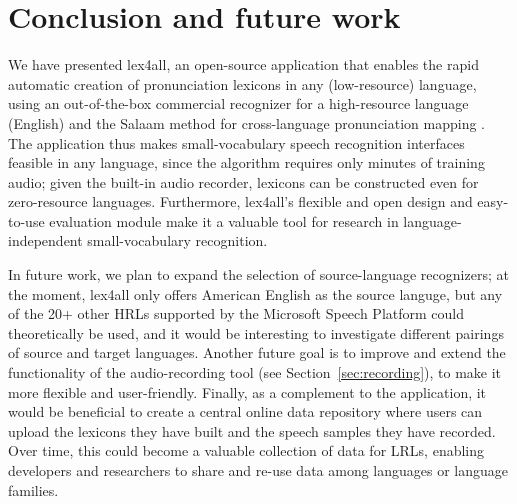 \documentclass[11pt]{article}
\begin{document}
\section{Conclusion and future work}
\label{sec:future}

We have presented lex4all, an open-source application that enables the rapid automatic creation of pronunciation lexicons in any (low-resource) language, using an out-of-the-box commercial recognizer \cite{mspsdk} for a high-resource language (English) and the Salaam method for cross-language pronunciation mapping \cite{Qiao10,Chan12}. The application thus makes small-vocabulary speech recognition interfaces feasible in any language, since the algorithm requires only minutes of training audio; given the built-in audio recorder, lexicons can be constructed even for zero-resource languages. 
Furthermore, lex4all's flexible and open design and easy-to-use evaluation module
make it a valuable tool for
research in language-independent small-vocabulary recognition.

In future work, we plan 
to expand the selection of source-language recognizers; at the moment, lex4all only offers American English as the source languge, but any of the 20+ other HRLs supported by the Microsoft Speech Platform could theoretically be used, and it would be interesting to investigate different pairings of source and target languages. Another future goal is to improve and extend the functionality of the audio-recording tool (see Section~\ref{sec:recording}), 
to make it more flexible and user-friendly.
Finally, as a complement to the application, it would be beneficial to 
create a central online data repository where users can 
upload the lexicons they have built and the speech samples they have recorded. %
Over time, this could become a valuable collection of data for LRLs, enabling developers and researchers to share and re-use data among languages or language families.
\end{document}
